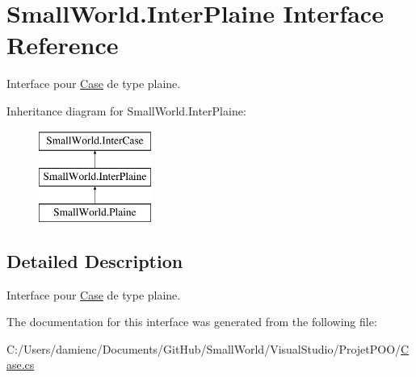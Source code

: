 \hypertarget{interface_small_world_1_1_inter_plaine}{\section{Small\-World.\-Inter\-Plaine Interface Reference}
\label{interface_small_world_1_1_inter_plaine}
}


Interface pour \hyperlink{class_small_world_1_1_case}{Case} de type plaine.  


Inheritance diagram for Small\-World.\-Inter\-Plaine\-:\begin{figure}[H]
\begin{center}
\leavevmode
\includegraphics[height=3.000000cm]{interface_small_world_1_1_inter_plaine}
\end{center}
\end{figure}


\subsection{Detailed Description}
Interface pour \hyperlink{class_small_world_1_1_case}{Case} de type plaine. 

The documentation for this interface was generated from the following file\-:\begin{DoxyCompactItemize}
\item 
C\-:/\-Users/damienc/\-Documents/\-Git\-Hub/\-Small\-World/\-Visual\-Studio/\-Projet\-P\-O\-O/\hyperlink{_case_8cs}{Case.\-cs}\end{DoxyCompactItemize}
